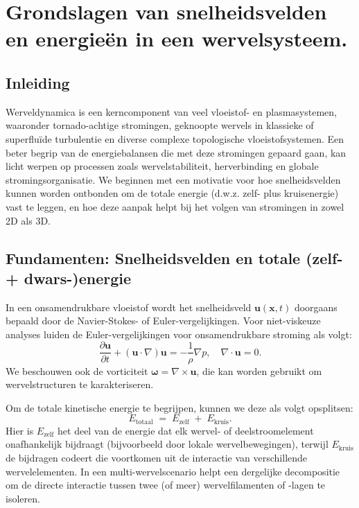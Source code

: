 \section{Grondslagen van snelheidsvelden en energieën in een wervelsysteem.}

\subsection{Inleiding}
Werveldynamica is een kerncomponent van veel vloeistof- en plasmasystemen, waaronder
tornado-achtige stromingen, geknoopte wervels in klassieke of superfluïde turbulentie en diverse
complexe topologische vloeistofsystemen. Een beter begrip van de energiebalansen
die met deze stromingen gepaard gaan, kan licht werpen op processen zoals wervelstabiliteit, herverbinding
en globale stromingsorganisatie. We beginnen met een motivatie voor hoe snelheidsvelden kunnen worden
ontbonden om de totale energie (d.w.z. zelf- plus kruisenergie) vast te leggen, en hoe
deze aanpak helpt bij het volgen van stromingen in zowel 2D als 3D.

\subsection{Fundamenten: Snelheidsvelden en totale (zelf- + dwars-)energie}
\label{sec:foundations}
In een onsamendrukbare vloeistof wordt het snelheidsveld $\mathbf{u}(\mathbf{x}, t)$ doorgaans
bepaald door de Navier-Stokes- of Euler-vergelijkingen. Voor niet-viskeuze analyses luiden de Euler-vergelijkingen voor onsamendrukbare stroming als volgt:
\begin{equation}
\frac{\partial \mathbf{u}}{\partial t} + (\mathbf{u} \cdot \nabla)\mathbf{u} = -\frac{1}{\rho}\nabla p,
\quad \nabla \cdot \mathbf{u} = 0.\label{eq:appendix:Euler}
\end{equation}
We beschouwen ook de vorticiteit $\boldsymbol{\omega} = \nabla \times \mathbf{u}$,
die kan worden gebruikt om wervelstructuren te karakteriseren.

Om de totale kinetische energie te begrijpen, kunnen we deze als volgt opsplitsen:
\begin{equation}
E_{\text{totaal}} \;=\; E_{\text{zelf}} \;+\; E_{\text{kruis}}.\label{eq:appendix:totale-energie}
\end{equation}
Hier is $E_{\text{zelf}}$ het deel van de energie dat elk wervel- of deelstroomelement onafhankelijk bijdraagt (bijvoorbeeld door lokale wervelbewegingen), terwijl
$E_{\text{kruis}}$ de bijdragen codeert die voortkomen uit de interactie van verschillende
wervelelementen. In een multi-wervelscenario helpt een dergelijke decompositie om de
directe interactie tussen twee (of meer) wervelfilamenten of -lagen te isoleren.

